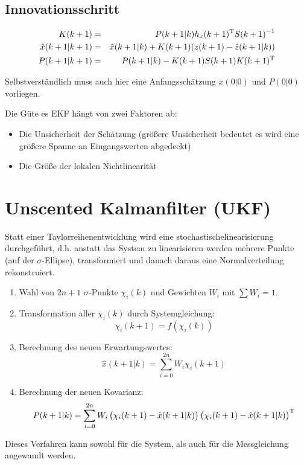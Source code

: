 \subsection{Innovationsschritt}
\begin{eqnarray*}
    K(k+1) &=& P(k+1|k) h_x(k+1)^\text{T} {S(k+1)}^{-1} \\
    \hat{x}(k+1|k+1) &=& \hat{x}(k+1|k) + K(k+1) (z(k+1) - \hat{z}(k+1|k)) \\
    P(k+1|k+1) &=& P(k+1|k) - K(k+1)S(k+1)K(k+1)^\text{T}
\end{eqnarray*}

Selbstverständlich muss auch hier eine Anfangsschätzung $x(0|0)$ und $P(0|0)$ vorliegen.

Die Güte es EKF hängt von zwei Faktoren ab:
\begin{itemize}
    \item Die Unsicherheit der Schätzung (größere Unsicherheit bedeutet es wird eine größere Spanne an Eingangswerten
        abgedeckt)
    \item Die Größe der lokalen Nichtlinearität
\end{itemize}

\section{Unscented Kalmanfilter (UKF)}
Statt einer Taylorreihenentwicklung wird eine \glqq stochastische\grqq linearisierung durchgeführt, d.h. anstatt das System
zu linearisieren werden mehrere Punkte (auf der $\sigma$-Ellipse), transformiert und danach daraus eine 
Normalverteilung rekonstruiert.

\begin{enumerate}
    \item Wahl von $2n+1$ $\sigma$-Punkte $\chi_i(k)$ und Gewichten $W_i$ mit $\sum W_i = 1$.
    \item Transformation aller $\chi_i(k)$ durch Systemgleichung:
        \begin{equation*}
            \chi_i(k+1) = f(\chi_i(k))
        \end{equation*}
    \item Berechnung des neuen Erwartungswertes:
        \begin{equation*}
            \hat{x}(k+1|k) = \sum_{i=0}^{2n} W_i \chi_i(k+1)
        \end{equation*}
    \item Berechnung der neuen Kovarianz:
        \begin{equation*}
            P(k+1|k) = \sum_{i=0}^{2n} W_i \left(\chi_i(k+1) - \hat{x}(k+1|k) \right) 
                \left(\chi_i(k+1) - \hat{x}(k+1|k) \right)^\text{T}
        \end{equation*}
\end{enumerate}
Dieses Verfahren kann sowohl für die System, als auch für die Messgleichung angewandt werden.


